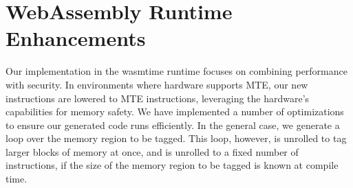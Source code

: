 \section{WebAssembly Runtime Enhancements}
\label{sec:wasm-runtime}

Our implementation in the wasmtime runtime focuses on combining performance with security.
In environments where hardware supports MTE, our new instructions are lowered to MTE instructions, leveraging the hardware's capabilities for memory safety.
We have implemented a number of optimizations to ensure our generated code runs efficiently.
In the general case, we generate a loop over the memory region to be tagged.
This loop, however, is unrolled to tag larger blocks of memory at once, and is unrolled to a fixed number of instructions, if the size of the memory region to be tagged is known at compile time.
